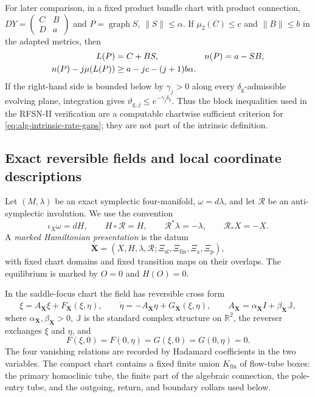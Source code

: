\documentclass[11pt]{amsart}
\numberwithin{equation}{section}
\theoremstyle{definition}
\theoremstyle{remark}
\newcommand{\R}{\mathbb R}
\newcommand{\J}{\mathbb J}
\newcommand{\cR}{\mathcal R}
\begin{document}
For later comparison, in a fixed product bundle chart with product
connection,
$DY=\left(\begin{smallmatrix}C&B\\D&a\end{smallmatrix}\right)$ and
$P=\operatorname{graph}S$, $\|S\|\le\alpha$.  If
$\mu_2(C)\le c$ and $\|B\|\le b$ in the adapted metrics, then
\begin{align}
 L(P)&=C+BS,& n(P)&=a-SB,
 \label{eq:intrinsic-to-block-rates}\\
 n(P)-j\mu(L(P))&\ge a-jc-(j+1)b\alpha .&&\notag
\end{align}
If the right-hand side is bounded below by $\gamma_j>0$ along every
$\delta_{\mathrm g}$-admissible evolving plane, integration gives
$\vartheta_{\mathrm g,j}\le e^{-\gamma_j\delta_{\mathrm g}}$.
Thus the block inequalities used in the RFSN-II verification are a
computable chartwise sufficient criterion for
\eqref{eq:alg-intrinsic-rate-gaps}; they are not part of the intrinsic
definition.

\subsection{Exact reversible fields and local coordinate descriptions}

Let $(M,\lambda)$ be an exact symplectic four-manifold,
$\omega=d\lambda$, and let $\cR$ be an anti-symplectic involution.  We use
the convention
\begin{equation}\label{eq:exact-reversible}
 \iota_X\omega=dH,\qquad H\circ\cR=H,\qquad
 \cR^*\lambda=-\lambda,\qquad \cR_*X=-X.
\end{equation}
A \emph{marked Hamiltonian presentation} is the datum
\begin{equation}\label{eq:marked-germ}
 \mathbf X=(X,H,\lambda,\cR;
       \Xi_{\mathrm{sf}},\Xi_{\mathrm{fin}},
       \Xi_{\mathrm a},\Xi_{\mathrm p}),
\end{equation}
with fixed chart domains and fixed transition maps on their overlaps.  The
equilibrium is marked by $O=0$ and $H(O)=0$.

In the saddle-focus chart the field has reversible cross form
\begin{equation}\label{eq:sf-cross-form}
 \dot\xi=A_{\mathbf X}\xi+F_{\mathbf X}(\xi,\eta),
 \qquad
 \dot\eta=-A_{\mathbf X}\eta+G_{\mathbf X}(\xi,\eta),
 \qquad
 A_{\mathbf X}=\alpha_{\mathbf X}I+
                  \beta_{\mathbf X}\J,
\end{equation}
where $\alpha_{\mathbf X},\beta_{\mathbf X}>0$, $\J$ is the standard
complex structure on $\R^2$, the reverser exchanges $\xi$ and $\eta$, and
\begin{equation}\label{eq:axis-vanishing}
 F(\xi,0)=F(0,\eta)=G(\xi,0)=G(0,\eta)=0.
\end{equation}
The four vanishing relations are recorded by Hadamard coefficients in the
two variables.  The compact chart contains a fixed finite union
$K_{\mathrm{fin}}$ of flow-tube boxes: the primary homoclinic tube, the
finite part of the algebraic connection, the pole-entry tube, and the
outgoing, return, and boundary collars used below.
\end{document}
